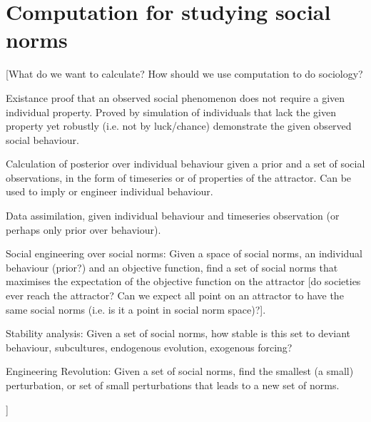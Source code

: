 \documentclass[a4paper]{article}
\begin{document}
\section{Computation for studying social norms}

[What do we want to calculate? How should we use computation to do sociology?

Existance proof that an observed social phenomenon does not require a given individual property. Proved by simulation of individuals that lack the given property yet robustly (i.e. not by luck/chance) demonstrate the given observed social behaviour.

Calculation of posterior over individual behaviour given a prior and a set of social observations, in the form of timeseries or of properties of the attractor. Can be used to imply or engineer individual behaviour.

Data assimilation, given individual behaviour and timeseries observation (or perhaps only prior over behaviour).

Social engineering over social norms: Given a space of social norms, an individual behaviour (prior?) and an objective function, find a set of social norms that maximises the expectation of the objective function on the attractor [do societies ever reach the attractor? Can we expect all point on an attractor to have the same social norms (i.e. is it a point in social norm space)?]. 

Stability analysis: Given a set of social norms, how stable is this set to deviant behaviour, subcultures, endogenous evolution, exogenous forcing?

Engineering Revolution: Given a set of social norms, find the smallest (a small) perturbation, or set of small perturbations that leads to a new set of norms.

]


\end{document}
